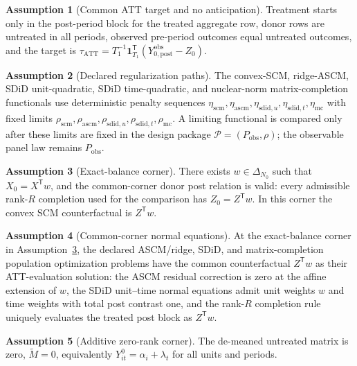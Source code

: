 \documentclass[11pt]{article}
\newcommand{\one}{\mathbf{1}}
\newcommand{\transpose}{\mathsf{T}}
\theoremstyle{definition}
\newtheorem{assumption}{Assumption}
\theoremstyle{plain}
\theoremstyle{remark}
\begin{document}
\begin{assumption}[Common ATT target and no anticipation]\label{ass:common-att}
Treatment starts only in the post-period block for the treated aggregate row, donor rows are untreated in all periods, observed pre-period outcomes equal untreated outcomes, and the target is \(\tau_{\mathrm{ATT}}=T_1^{-1}\one_{T_1}^\transpose(Y^{\mathrm{obs}}_{0,\mathrm{post}}-Z_0)\).
\end{assumption}

\begin{assumption}[Declared regularization paths]\label{ass:regularization-paths}
The convex-SCM, ridge-ASCM, SDiD unit-quadratic, SDiD time-quadratic, and nuclear-norm matrix-completion functionals use deterministic penalty sequences \(\eta_{\mathrm{scm}},\eta_{\mathrm{ascm}},\eta_{\mathrm{sdid},u},\eta_{\mathrm{sdid},t},\eta_{\mathrm{mc}}\) with fixed limits \(\rho_{\mathrm{scm}},\rho_{\mathrm{ascm}},\rho_{\mathrm{sdid},u},\rho_{\mathrm{sdid},t},\rho_{\mathrm{mc}}\). A limiting functional is compared only after these limits are fixed in the design package \(\mathcal P=(P_{\mathrm{obs}},\rho)\); the observable panel law remains \(P_{\mathrm{obs}}\).
\end{assumption}

\begin{assumption}[Exact-balance corner]\label{ass:exact-balance-corner}
There exists \(w\in\Delta_{N_0}\) such that \(X_0=X^\transpose w\), and the common-corner donor post relation is valid: every admissible rank-\(R\) completion used for the comparison has \(Z_0=Z^\transpose w\). In this corner the convex SCM counterfactual is \(Z^\transpose w\).
\end{assumption}

\begin{assumption}[Common-corner normal equations]\label{ass:common-corner-normal-equations}
At the exact-balance corner in Assumption~\ref{ass:exact-balance-corner}, the declared ASCM/ridge, SDiD, and matrix-completion population optimization problems have the common counterfactual \(Z^\transpose w\) as their ATT-evaluation solution: the ASCM residual correction is zero at the affine extension of \(w\), the SDiD unit--time normal equations admit unit weights \(w\) and time weights with total post contrast one, and the rank-\(R\) completion rule uniquely evaluates the treated post block as \(Z^\transpose w\).
\end{assumption}

\begin{assumption}[Additive zero-rank corner]\label{ass:additive-corner}
The de-meaned untreated matrix is zero, \(\widetilde M=0\), equivalently \(Y^0_{it}=\alpha_i+\lambda_t\) for all units and periods.
\end{assumption}
\end{document}
